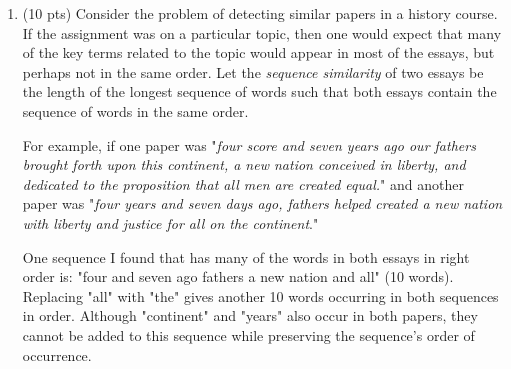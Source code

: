 \documentclass[11pt]{article}
\newtheorem*{solution}{Solution}
\begin{document}
\begin{enumerate}
\begin{enumerate}
\begin{solution}
\end{solution}
\newpage

\item (2 pts) Derive a recurrence for $C(k)$
in terms of $C(j)$ values where $j<k$.
\begin{solution}

\end{solution}
\newpage

\item (4 pts) 
Give a bottom-up iterative algorithm for computing the
$C(j)$ values.  
This algorithm may also compute ``signpost'' values for use in the following part.

For part (c), it may be helpful to first construct a recursive algorithm for
computing the $C(k)$ values.
\begin{solution}

\end{solution}
\newpage

\item(1 pt) 
Finally, show how keeping a little (i.e.~$O(n)$) additional information allows the
a cheapest sequence of canoe rentals to be printed out in $O(n)$ time.
\begin{solution}

\end{solution}
\newpage
\end{enumerate}



\item (10 pts) 
Consider the problem of detecting similar papers in a history course. 
If the assignment was on a particular topic, then one would expect that many of the key terms related to the topic would appear in most of the essays, but perhaps not in the same order.
Let the \emph{sequence similarity} of two essays be the length of the longest sequence of words such that both essays contain the sequence of words in the same order.

For example, if one paper was "\emph{four score and seven years ago our fathers brought forth upon this continent, a new nation conceived in liberty, and dedicated to the proposition that all men are created equal.}"  and another paper was "\emph{four years and seven days ago, fathers helped created a new nation with liberty and justice for all on the continent}."

One sequence I found that has many of the words in both essays in right order is:
"four and seven ago fathers a new nation and all" (10 words).  Replacing "all" with "the" gives another 10 words occurring in both sequences in order.
Although "continent" and "years" also occur in both papers, they cannot be added to this sequence while preserving the sequence's order of occurrence. 


\end{enumerate}
\end{document}
